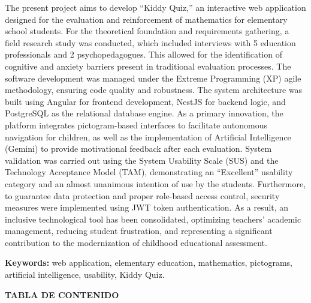 \documentclass[12pt,a4paper,oneside]{report}
\begin{document}
\justifying
{}
The present project aims to develop ``Kiddy Quiz,'' an interactive web application designed for the evaluation and reinforcement of mathematics for elementary school students. For the theoretical foundation and requirements gathering, a field research study was conducted, which included interviews with 5 education professionals and 2 psychopedagogues. This allowed for the identification of cognitive and anxiety barriers present in traditional evaluation processes. The software development was managed under the Extreme Programming (XP) agile methodology, ensuring code quality and robustness. The system architecture was built using Angular for frontend development, NestJS for backend logic, and PostgreSQL as the relational database engine. As a primary innovation, the platform integrates pictogram-based interfaces to facilitate autonomous navigation for children, as well as the implementation of Artificial Intelligence (Gemini) to provide motivational feedback after each evaluation. System validation was carried out using the System Usability Scale (SUS) and the Technology Acceptance Model (TAM), demonstrating an ``Excellent'' usability category and an almost unanimous intention of use by the students. Furthermore, to guarantee data protection and proper role-based access control, security measures were implemented using JWT token authentication. As a result, an inclusive technological tool has been consolidated, optimizing teachers' academic management, reducing student frustration, and representing a significant contribution to the modernization of childhood educational assessment.

\vspace{0.5cm}

\noindent\textbf{Keywords:} web application, elementary education, mathematics, pictograms, artificial intelligence, usability, Kiddy Quiz.

\newpage

\begin{center}
    \vspace*{-0.8cm}
    {\bfseries TABLA DE CONTENIDO}
\end{center}
\vspace{0.1cm}
\end{document}
